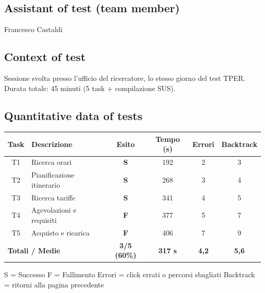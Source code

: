 \documentclass[11pt,a4paper]{article}
\begin{document}
\subsection*{Assistant of test (team member)}
\begin{tcolorbox}[colback=backgroundColor,colframe=borderColor,arc=2mm]
Francesco Castaldi
\end{tcolorbox}

\subsection*{Context of test}
\begin{tcolorbox}[colback=backgroundColor,colframe=borderColor,arc=2mm]
Sessione svolta presso l'ufficio del ricercatore, lo stesso giorno del test TPER. Durata totale: 45 minuti (5 task + compilazione SUS).
\end{tcolorbox}

\subsection*{Quantitative data of tests}
\begin{tcolorbox}[colback=backgroundColor,colframe=borderColor,arc=2mm]
\begin{center}
\renewcommand{\arraystretch}{1.4}
\begin{tabular}{clcccc}
\toprule
\textbf{Task} & \textbf{Descrizione} &
\textbf{Esito} & \textbf{Tempo (s)} &
\textbf{Errori} & \textbf{Backtrack} \\
\midrule
T1 & Ricerca orari             & \textbf{S} & 192 & 2 & 3 \\
T2 & Pianificazione itinerario & \textbf{S} & 268 & 3 & 4 \\
T3 & Ricerca tariffe           & \textbf{S} & 341 & 4 & 5 \\
T4 & Agevolazioni e requisiti  & \textbf{F} & 377 & 5 & 7 \\
T5 & Acquisto e ricarica       & \textbf{F} & 406 & 7 & 9 \\
\midrule
\multicolumn{2}{l}{\textbf{Totali / Medie}} &
\textbf{3/5 (60\%)} & \textbf{317 s} &
\textbf{4,2} & \textbf{5,6} \\
\bottomrule
\end{tabular}
\end{center}
\vspace{0.3cm}
\small S = Successo \quad F = Fallimento \quad Errori = click errati o percorsi sbagliati \quad Backtrack = ritorni alla pagina precedente
\end{tcolorbox}
\end{document}
